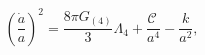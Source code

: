 \begin{equation}\label{BIRS}
  \left(\frac{\dot{a}}{a}\right)^2=\frac{8\pi G_{(4)}}{3}\Lambda_4
  +\frac{\mathcal{C}~}{a^4}-\frac{k}{a^2},
\end{equation}

